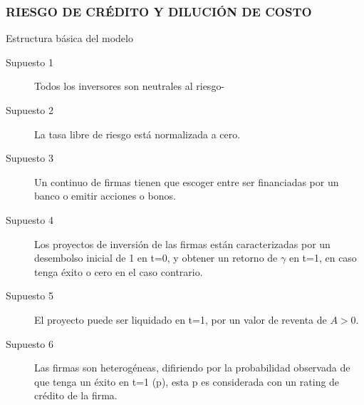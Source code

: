 \begin{frame}
    \frametitle{{\normalsize RIESGO DE CRÉDITO Y DILUCIÓN DE COSTO} {}}
    
    \begin{block} {Estructura básica del modelo}
        \begin{description}
            \item[Supuesto 1]  Todos los inversores son neutrales al riesgo-
            \item[Supuesto 2] La tasa libre de riesgo está normalizada a cero.
            \item[Supuesto 3] Un continuo de firmas tienen que escoger entre ser financiadas por un banco o emitir acciones o bonos.
            \item[Supuesto 4] Los proyectos de inversión de las firmas están caracterizadas por un desembolso inicial de 1 en t=0, y obtener un retorno de $\gamma$ en t=1, en caso tenga éxito o cero en el caso contrario.
           \item[Supuesto 5] El proyecto puede ser liquidado en t=1, por un valor de reventa de $A>0$.
           \item[Supuesto 6] Las firmas son heterogéneas, difiriendo por la probabilidad observada de que tenga un éxito en t=1 (p), esta p es considerada con un rating de crédito de la firma.          
      \end{description}
        
    \end{block}	
    
\end{frame}



